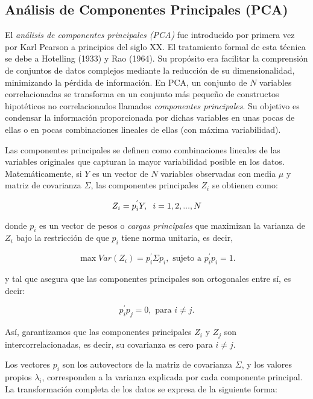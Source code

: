\subsection{Análisis de Componentes Principales (PCA)}

El \textit{análisis de componentes principales (PCA)} fue introducido por primera vez por Karl Pearson a principios del siglo XX. El 
tratamiento formal de esta técnica se debe a Hotelling (1933) y Rao (1964). Su propósito era facilitar la comprensión de conjuntos 
de datos complejos mediante la reducción de su dimensionalidad, minimizando la pérdida de información. En PCA, un conjunto de $N$ variables correlacionadas
se transforma en un conjunto más pequeño de constructos hipotéticos no correlacionados llamados \textit{componentes principales}.
Su objetivo es condensar la información proporcionada por dichas variables en unas pocas de ellas o en pocas combinaciones lineales de 
ellas (con máxima variabilidad). \newline %


Las componentes principales se definen como combinaciones lineales de las variables originales que capturan la mayor variabilidad
posible en los datos. Matemáticamente, si $Y$ es un vector de $N$ variables observadas con media $\mu$ y matriz de covarianza $\Sigma$,
las componentes principales $Z_{i}$ se obtienen como:


\[
Z_{i} = p^{'}_{i} Y, \hspace{0.2cm} i=1,2,...,N
\]

donde $p_{i}$ es un vector de pesos o \textit{cargas principales} que maximizan la varianza de $Z_{i}$ bajo la restricción de que $p_{i}$
tiene norma unitaria, es decir,

\[%
\max Var(Z_{i}) = p_{i}^{'}\Sigma p_{i}, \text{ sujeto a } p_{i}^{'}p_{i} = 1.
\]

y tal que asegura que las componentes principales son ortogonales entre sí, es decir:

\[
p_{i}^{'}p_{j} = 0, \text{ para } i \neq j.
\]

Así, garantizamos que las componentes principales $Z_{i}$ y $Z_{j}$ son intercorrelacionadas, es decir, su covarianza es cero para $i\neq j$.


Los vectores $p_{i}$ son los autovectors de la matriz de covarianza $\Sigma$, y los valores propios $\lambda_{i}$, corresponden
a la varianza explicada por cada componente principal. La transformación completa de los datos se expresa de la siguiente forma:


